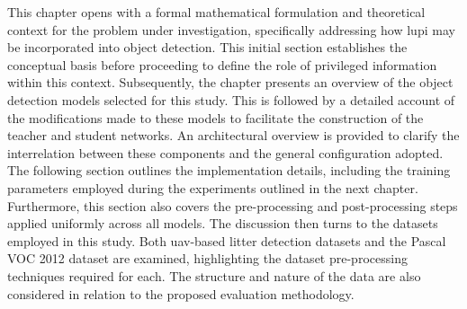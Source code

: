 This chapter opens with a formal mathematical formulation and theoretical context for the problem under investigation, specifically addressing how \gls{lupi} may be incorporated into object detection. This initial section establishes the conceptual basis before proceeding to define the role of privileged information within this context.
Subsequently, the chapter presents an overview of the object detection models selected for this study. This is followed by a detailed account of the modifications made to these models to facilitate the construction of the teacher and student networks. An architectural overview is provided to clarify the interrelation between these components and the general configuration adopted.
The following section outlines the implementation details, including the training parameters employed during the experiments outlined in the next chapter. Furthermore, this section also covers the pre-processing and post-processing steps applied uniformly across all models.
The discussion then turns to the datasets employed in this study. Both \gls{uav}-based litter detection datasets and the Pascal VOC 2012 dataset are examined, highlighting the dataset pre-processing techniques required for each. The structure and nature of the data are also considered in relation to the proposed evaluation methodology.


